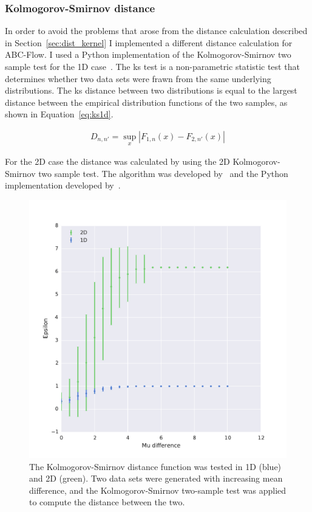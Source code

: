 \subsubsection{Kolmogorov-Smirnov distance}
\label{sec:dist_ks}

In order to avoid the problems that arose from the distance calculation described in Section~\ref{sec:dist_kernel} I implemented a different distance calculation for ABC-Flow. I used a Python implementation of the Kolmogorov-Smirnov two sample test for the 1D case~\autocite{Kolmogorov:1933}. The \acrfull{ks} test is a non-parametric statistic test that determines whether two data sets were frawn from the same underlying distributions. The \acrshort{ks} distance between two distributions is equal to the largest distance between the empirical distribution functions of the two samples, as shown in Equation~\ref{eq:ks1d}.%

\begin{align}
\label{eq:ks1d}
D_{n,n'}=\sup _{x}|F_{1,n}(x)-F_{2,n'}(x)|
\end{align}

For the 2D case the distance was calculated by using the 2D Kolmogorov-Smirnov two sample test. The algorithm was developed by~\textcite{Fasano:1987hg} and the Python implementation developed by~\textcite{Syrtis2016}. 

\begin{figure}[tb]
\begin{center}
	\includegraphics[scale=0.5]{../../chapters/chapterABCFlow/images/epsilon_uniform_musd_KS2sam.pdf}			
	\caption[LoF caption]{\label{fig:ks-1d2d}The Kolmogorov-Smirnov distance function was tested in 1D (blue) and 2D (green). Two data sets were generated with increasing mean difference, and the Kolmogorov-Smirnov two-sample test was applied to compute the distance between the two.}
	\end{center}
\end{figure}

